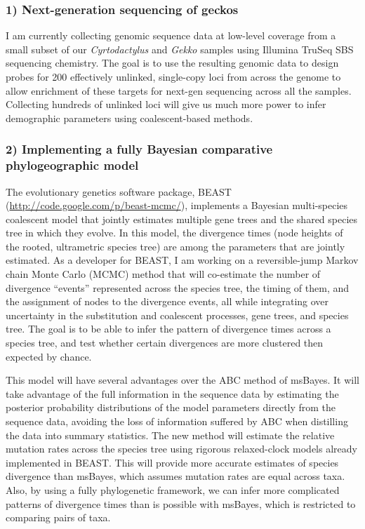 \documentclass[10pt]{article}
\begin{document}
\subsubsection*{1) Next-generation sequencing of geckos}
I am currently collecting genomic sequence data at low-level coverage from a small subset of our \emph{Cyrtodactylus} and \emph{Gekko} samples using Illumina TruSeq SBS sequencing chemistry.
The goal is to use the resulting genomic data to design probes for 200 effectively unlinked, single-copy loci from across the genome to allow enrichment of these targets for next-gen sequencing across all the samples.
Collecting hundreds of unlinked loci will give us much more power to infer demographic parameters using coalescent-based methods.

\subsubsection*{2) Implementing a fully Bayesian comparative phylogeographic model}
The evolutionary genetics software package, BEAST (\url{http://code.google.com/p/beast-mcmc/}), implements a Bayesian multi-species coalescent model that jointly estimates multiple gene trees and the shared species tree in which they evolve.
In this model, the divergence times (node heights of the rooted, ultrametric species tree) are among the parameters that are jointly estimated.
As a developer for BEAST, I am working on a reversible-jump Markov chain Monte Carlo (MCMC) method that will co-estimate the number of divergence ``events'' represented across the species tree, the timing of them, and the assignment of nodes to the divergence events, all while integrating over uncertainty in the substitution and coalescent processes, gene trees, and species tree.
The goal is to be able to infer the pattern of divergence times across a species tree, and test whether certain divergences are more clustered then expected by chance.

This model will have several advantages over the ABC method of msBayes.
It will take advantage of the full information in the sequence data by estimating the posterior probability distributions of the model parameters directly from the sequence data, avoiding the loss of information suffered by ABC when distilling the data into summary statistics.
The new method will estimate the relative mutation rates across the species tree using rigorous relaxed-clock models already implemented in BEAST.
This will provide more accurate estimates of species divergence than msBayes, which assumes mutation rates are equal across taxa.
Also, by using a fully phylogenetic framework, we can infer more complicated patterns of divergence times than is possible with msBayes, which is restricted to comparing pairs of taxa.
\end{document}
